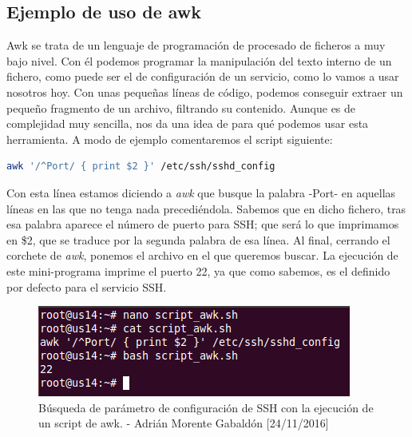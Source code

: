	\subsection{Ejemplo de uso de awk}
	Awk se trata de un lenguaje de programación de procesado de ficheros a muy bajo nivel. Con él podemos programar la manipulación del texto interno de un fichero, como puede ser el de configuración de un servicio, como lo vamos a usar nosotros hoy. Con unas pequeñas líneas de código, podemos conseguir extraer un pequeño fragmento de un archivo, filtrando su contenido. Aunque es de complejidad muy sencilla, nos da una idea de para qué podemos usar esta herramienta. A modo de ejemplo comentaremos el script siguiente:
	\begin{lstlisting}[language=bash]
	awk '/^Port/ { print $2 }' /etc/ssh/sshd_config
	\end{lstlisting}
	Con esta línea estamos diciendo a \emph{awk} que busque la palabra -Port- en aquellas líneas en las que no tenga nada precediéndola. Sabemos que en dicho fichero, tras esa palabra aparece el número de puerto para SSH; que será lo que imprimamos en \$2, que se traduce por la segunda palabra de esa línea. Al final, cerrando el corchete de \emph{awk}, ponemos el archivo en el que queremos buscar. La ejecución de este mini-programa imprime el puerto 22, ya que como sabemos, es el definido por defecto para el servicio SSH.
	\begin{figure}[H]
		\centering
		\includegraphics[scale=0.75]{awk}
		\caption{Búsqueda de parámetro de configuración de SSH con la ejecución de un script de awk. - Adrián Morente Gabaldón [24/11/2016]}
	\end{figure}


